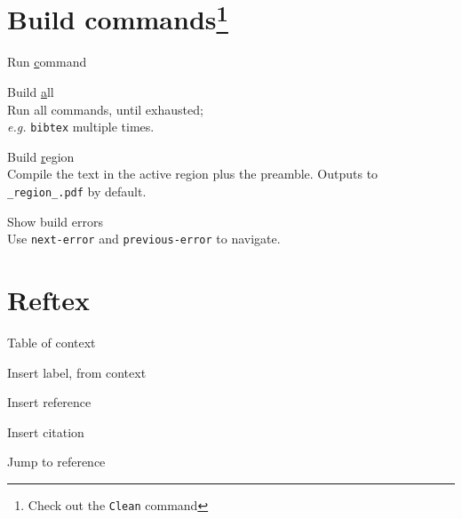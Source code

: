 \documentclass[landscape]{article}
\newcommand{\kbd}[1]{\colorbox{gray!10!}{\texttt{#1}}}
\newcommand{\element}[2][-]{\item[#1] \parbox[t]{\linewidth}{#2}}
\begin{document}
\begin{multicols}{3}
\section*{Build commands\footnote{ Check out the \texttt{Clean} command}}

\begin{description}[align=left,labelwidth=1.5cm]
\element[\kbd{C-c C-c}]{ Run \underline{c}ommand }
\element[\kbd{C-c C-a}]{ Build \underline{a}ll \\
  Run all commands, until exhausted; \\
  \textit{e.g.} \texttt{bibtex} multiple times. }
\element[\kbd{C-c C-r}]{ Build \underline{r}egion \\
  Compile the text in the active region plus the preamble. Outputs to \texttt{\_region\_.pdf} by default.}
\element[\kbd{C-c \`}]{ Show build errors \\
  Use \texttt{next-error} and \texttt{previous-error} to navigate. }
\end{description}

\section*{Reftex}

\begin{description}[align=left,labelwidth=1cm]
\element[\kbd{C-c =}]{ Table of context }
\element[\kbd{C-c (}]{ Insert label, from context }
\element[\kbd{C-c )}]{ Insert reference }
\element[\kbd{C-c [}]{  Insert citation }
\element[\kbd{C-c \&}]{ Jump to reference }
\end{description}

\end{multicols}
\end{document}

